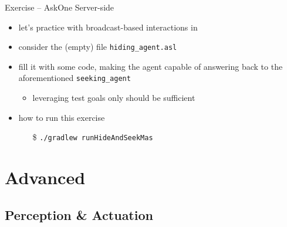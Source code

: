 \documentclass[presentation]{beamer}\mode<presentation>{\usetheme{AMSBolognaFC}}
\begin{document}
\startExercise
\begin{frame}[c, allowframebreaks]{Exercise \currentExercise{} -- AskOne Server-side}
\begin{itemize}
    \item let's practice with broadcast-based interactions in \jason{}
    
    \vspace{.3cm}
    
    \item consider the (empty) file \texttt{hiding\_agent.asl}
    
    \vspace{.3cm}
    
    \item fill it with some \jason{} code, making the agent capable of answering back to the aforementioned \texttt{seeking\_agent}
    \begin{itemize}
        \item leveraging test goals only should be sufficient
    \end{itemize}
    
    \vspace{.3cm}
    
    \item how to run this exercise
    \begin{itemize}
        \item[\$] \texttt{./gradlew run\alert{HideAndSeek}Mas}
    \end{itemize}
    
\end{itemize}
\end{frame}

\section{\jason{} Advanced}

\subsection{Perception \& Actuation}
\end{document}
